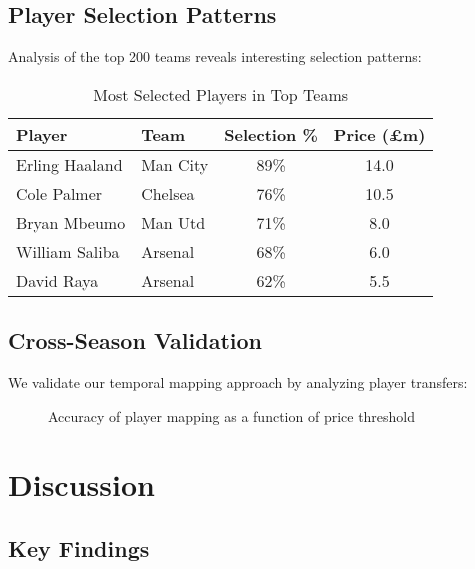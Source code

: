 \documentclass[12pt]{article}
\begin{document}
\subsection{Player Selection Patterns}

Analysis of the top 200 teams reveals interesting selection patterns:

\begin{table}[H]
\centering
\caption{Most Selected Players in Top Teams}
\begin{tabular}{llcc}
\toprule
Player & Team & Selection \% & Price (£m) \\
\midrule
Erling Haaland & Man City & 89\% & 14.0 \\
Cole Palmer & Chelsea & 76\% & 10.5 \\
Bryan Mbeumo & Man Utd & 71\% & 8.0 \\
William Saliba & Arsenal & 68\% & 6.0 \\
David Raya & Arsenal & 62\% & 5.5 \\
\bottomrule
\end{tabular}
\end{table}

\subsection{Cross-Season Validation}

We validate our temporal mapping approach by analyzing player transfers:

\begin{figure}[H]
\centering
{}
\caption{Accuracy of player mapping as a function of price threshold}
\end{figure}

\section{Discussion}

\subsection{Key Findings}
\end{document}
